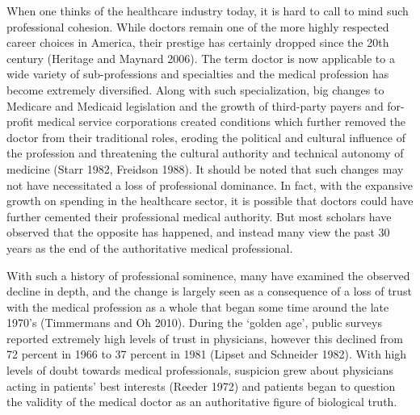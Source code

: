\documentclass[12pt,twoside]{reedthesis}
\begin{document}
  When one thinks of the healthcare industry today, it is hard to call to
  mind such professional cohesion. While doctors remain one of the more
  highly respected career choices in America, their prestige has certainly
  dropped since the 20th century (Heritage and Maynard 2006). The term
  doctor is now applicable to a wide variety of sub-professions and
  specialties and the medical profession has become extremely diversified.
  Along with such specialization, big changes to Medicare and Medicaid
  legislation and the growth of third-party payers and for-profit medical
  service corporations created conditions which further removed the doctor
  from their traditional roles, eroding the political and cultural
  influence of the profession and threatening the cultural authority and
  technical autonomy of medicine (Starr 1982, Freidson 1988). It should be
  noted that such changes may not have necessitated a loss of professional
  dominance. In fact, with the expansive growth on spending in the
  healthcare sector, it is possible that doctors could have further
  cemented their professional medical authority. But most scholars have
  observed that the opposite has happened, and instead many view the past
  30 years as the end of the authoritative medical professional.
  
  With such a history of professional sominence, many have examined the
  observed decline in depth, and the change is largely seen as a
  consequence of a loss of trust with the medical profession as a whole
  that began some time around the late 1970's (Timmermans and Oh 2010).
  During the `golden age', public surveys reported extremely high levels
  of trust in physicians, however this declined from 72 percent in 1966 to
  37 percent in 1981 (Lipset and Schneider 1982). With high levels of
  doubt towards medical professionals, suspicion grew about physicians
  acting in patients' best interests (Reeder 1972) and patients began to
  question the validity of the medical doctor as an authoritative figure
  of biological truth.
  
\end{document}
